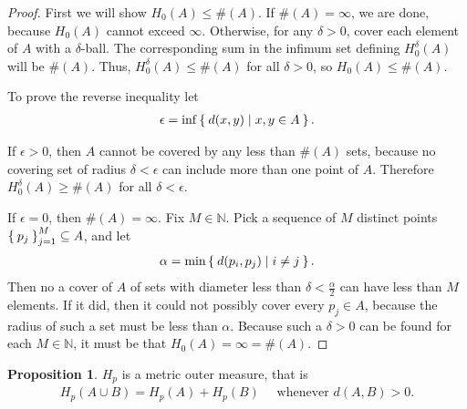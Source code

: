\documentclass[11pt]{amsart}
\theoremstyle{definition}
\newtheorem{prop}[definition]{Proposition}
\newtheorem{ex}[definition]{Exercise}
\newcommand{\N}{\ensuremath{\mathbb{N}}}
\DeclareMathOperator{\diam}{diam}
\begin{document}
\begin{proof}
%	
	First we will show \( H_0(A) \leq \#(A) \). If \( \#(A) = \infty \), we are done, because \( H_0(A) \) cannot exceed \( \infty \). Otherwise, for any \( \delta > 0 \), cover each element of \( A \) with a \( \delta \)-ball.  The corresponding sum in the infimum set defining \( H_0^\delta (A) \) will be \( \#(A)\). Thus, \( H_0^\delta (A) \leq \#(A) \) for all \( \delta > 0 \), so \( H_0(A) \leq \#(A) \).

	To prove the reverse inequality let 
	\begin{align}
		\epsilon = \inf \Set{ d(x, y) | x, y \in A } .
	\end{align}
	
	If \( \epsilon > 0\), then \( A \) cannot be covered by any less than \( \# (A) \) sets, because no covering set of radius \( \delta < \epsilon \) can include more than one point of \( A \). Therefore \( H_0^\delta(A) \geq \#(A) \) for all \( \delta < \epsilon \). 
	
	If \( \epsilon = 0 \), then \( \#(A) = \infty \). Fix \( M \in \N \). Pick a sequence of \( M \) distinct points \( \Set{p_j}_{j = 1}^{M} \subseteq A \), and let  
	\begin{align}
			\alpha = \min \Set{ d(p_i, p_j) | i \neq j }.
	\end{align}
	Then no a cover of \( A \) of sets with diameter less than \( \delta  < \frac{\alpha}{2} \) can have less than \(M\) elements. If it did, then it could not possibly cover every \( p_j \in A \), because the radius of such a set must be less than \( \alpha \). Because such a \( \delta > 0\) can be found for each \( M \in \N \), it must be that \( H_0 (A) = \infty = \#(A) \). 
\end{proof}

%	


\begin{prop}
	\(H_p\) is a metric outer measure, that is
	\begin{align}
		 H_p(A \cup B) = H_p(A) + H_p(B)
		 \quad \text{ whenever } d(A, B) > 0 .
	\end{align}
\end{prop}
\end{document}
